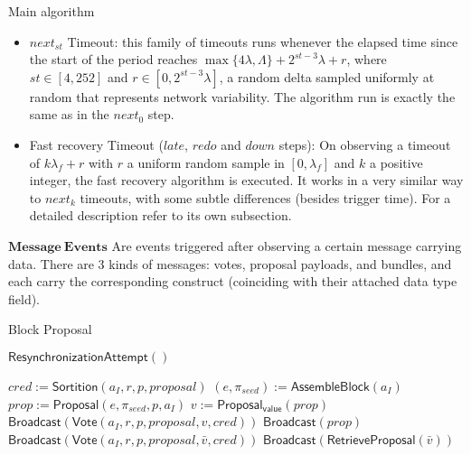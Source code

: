 \documentclass[10pt,a4paper]{article}
\begin{document}
\begin{section}{Main algorithm}
\begin{itemize}
    \item $next_{st}$ Timeout: this family of timeouts runs whenever the elapsed time since the start of the period reaches
    $\max\{4\lambda, \Lambda \} + 2^{st-3}\lambda + r$, where $st\in [4, 252]$ and $r \in [0, 2^{st-3}\lambda]$, a random 
    delta sampled uniformly at random that represents network variability.
    The algorithm run is exactly the same as in the $next_0$ step.

    \item Fast recovery Timeout ($late$, $redo$ and $down$ steps): On observing a timeout of $k\lambda_f + r$ with $r$ a uniform random sample in $[0, \lambda_f]$ and
    $k$ a positive integer, the fast recovery algorithm is executed. It works in a very similar way to $next_k$ timeouts, with some subtle differences (besides trigger time).
    For a detailed description refer to its own subsection.
\end{itemize}


$\mathbf{Message \ Events}$ Are events triggered after observing a certain message carrying data.
There are 3 kinds of messages: votes, proposal payloads, and bundles, and each carry
the corresponding construct (coinciding with their attached data type field).

\begin{subsection}{Block Proposal}\label{ssect:blockproposal}

    \begin{algorithm}
        \caption{\underline{Block Proposal}}
        \label{algo:block-proposal}
        \begin{algorithmic}[1]

            \State $\mathsf{ResynchronizationAttempt}()$

                \State $cred :=  \mathsf{Sortition}(a_I, r,p, proposal)$
                        \State $(e,\pi_{seed}) := \mathsf{AssembleBlock}(a_I)$
                        \State $prop := \mathsf{Proposal}(e, \pi_{seed}, p, a_I)$
                        \State $v := \mathsf{Proposal_{value}}(prop)$
                        \State $\mathsf{Broadcast}(\mathsf{Vote}(a_I, r, p, proposal, v, cred))$
                        \State $\mathsf{Broadcast}(prop)$
                    \Else
                        \State $\mathsf{Broadcast}(\mathsf{Vote}(a_I, r, p, proposal, \bar{v}, cred))$
                            \State $\mathsf{Broadcast}(\mathsf{RetrieveProposal}(\bar{v}))$
                        \EndIf
                    \EndIf
                \EndIf
            \EndFor
        \EndFunction
        \end{algorithmic}
    \end{algorithm}


\end{subsection}
\end{section}
\end{document}

